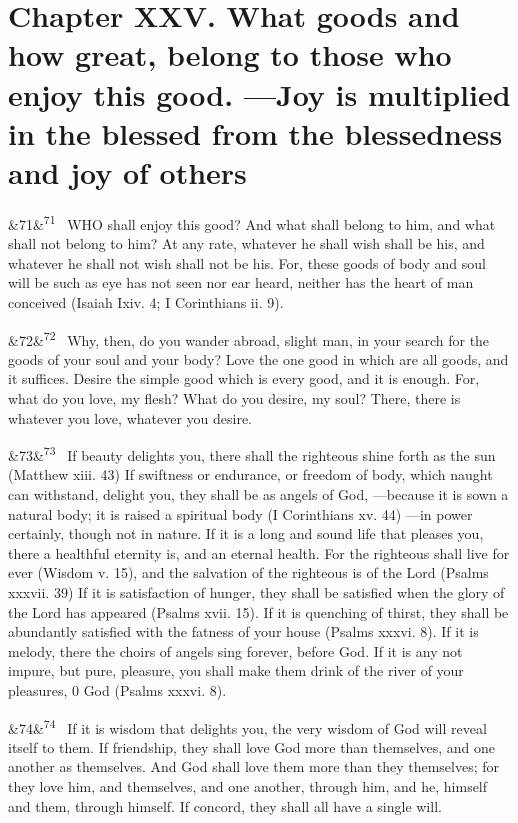 \documentclass[12pt]{article}
\newcommand{\para}[1][]{\par\noindent\ifx&#1&\else\textsuperscript{\footnotesize #1}~\fi}
\begin{document}
\section*{Chapter XXV. What goods and how great, belong to those who enjoy this good. ---Joy is multiplied in the blessed from the blessedness and joy of others}

\para[71] WHO shall enjoy this good? And what shall belong to him, and what shall not belong to him? At any rate, whatever he shall wish shall be his, and whatever he shall not wish shall not be his. For, these goods of body and soul will be such as eye has not seen nor ear heard, neither has the heart of man conceived (Isaiah Ixiv. 4; I Corinthians ii. 9).

\para[72] Why, then, do you wander abroad, slight man, in your search for the goods of your soul and your body? Love the one good in which are all goods, and it suffices. Desire the simple good which is every good, and it is enough. For, what do you love, my flesh? What do you desire, my soul? There, there is whatever you love, whatever you desire.

\para[73] If beauty delights you, there shall the righteous shine forth as the sun (Matthew xiii. 43) If swiftness or endurance, or freedom of body, which naught can withstand, delight you, they shall be as angels of God, ---because it is sown a natural body; it is raised a spiritual body (I Corinthians xv. 44) ---in power certainly, though not in nature. If it is a long and sound life that pleases you, there a healthful eternity is, and an eternal health. For the righteous shall live for ever (Wisdom v. 15), and the salvation of the righteous is of the Lord (Psalms xxxvii. 39) If it is satisfaction of hunger, they shall be satisfied when the glory of the Lord has appeared (Psalms xvii. 15). If it is quenching of thirst, they shall be abundantly satisfied with the fatness of your house (Psalms xxxvi. 8). If it is melody, there the choirs of angels sing forever, before God. If it is any not impure, but pure, pleasure, you shall make them drink of the river of your pleasures, 0 God (Psalms xxxvi. 8).

\para[74] If it is wisdom that delights you, the very wisdom of God will reveal itself to them. If friendship, they shall love God more than themselves, and one another as themselves. And God shall love them more than they themselves; for they love him, and themselves, and one another, through him, and he, himself and them, through himself. If concord, they shall all have a single will.
\end{document}
